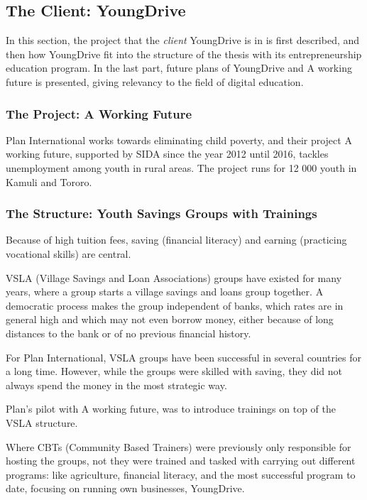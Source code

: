\subsection{The Client: YoungDrive}

In this section, the project that the \textit{client} YoungDrive is in is first described, and then how YoungDrive  fit into the structure of the thesis with its entrepreneurship education program. In the last part, future plans of YoungDrive and A working future is presented, giving relevancy to the field of digital education.

\subsubsection{The Project: A Working Future}

Plan International works towards eliminating child poverty, and their project A working future, supported by SIDA since the year 2012 until 2016, tackles unemployment among youth in rural areas. The project runs for 12 000 youth in Kamuli and Tororo.

\subsubsection{The Structure: Youth Savings Groups with Trainings}

Because of high tuition fees, saving (financial literacy) and earning (practicing vocational skills) are central.

VSLA (Village Savings and Loan Associations) groups have existed for many years, where a group starts a village savings and loans group together. A democratic process makes the group independent of banks, which rates are in general high and which may not even borrow money, either because of long distances to the bank or of no previous financial history.

For Plan International, VSLA groups have been successful in several countries for a long time. However, while the groups were skilled with saving, they did not always spend the money in the most strategic way.

Plan's pilot with A working future, was to introduce trainings on top of the VSLA structure.

Where CBTs (Community Based Trainers) were previously only responsible for hosting the groups, not they were trained and tasked with carrying out different programs: like agriculture, financial literacy, and the most successful program to date, focusing on running own businesses, YoungDrive.

